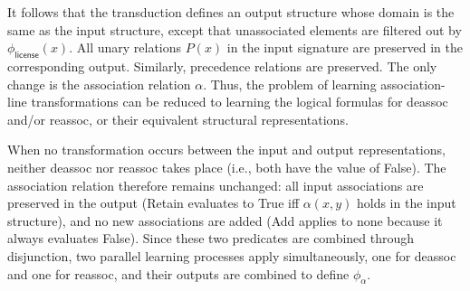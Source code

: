 \documentclass[pmlr]{jmlr}%
\begin{document}
	It follows that the transduction 
	defines an output structure whose domain is the same as the input 
	structure, except that unassociated elements are filtered out by
	$\phi_{\textsf{license}}(x)$. All 
	unary relations \(P(x)\) in the input signature are 
	preserved in the corresponding output. Similarly,
	precedence relations are preserved. The only 
	change is the association relation \(\alpha\).
	Thus, the problem of learning association-line 
	transformations can be reduced to learning the logical 
	formulas for \textsf{deassoc} and/or \textsf{reassoc}, or their equivalent structural representations. 
	
	When no transformation occurs between the input and 
	output representations, neither \textsf{deassoc} nor 
	\textsf{reassoc} takes place (i.e., both have the value of
	False). The association relation therefore remains unchanged: 
	all input associations are preserved in the output 
	(\textsf{Retain} evaluates to True iff \(\alpha(x,y)\) holds in the input structure), and no new associations are 
	added (\textsf{Add} applies to none because it always evaluates False).
	Since these two predicates are combined through disjunction, 
	two parallel learning processes apply simultaneously, one for \textsf{deassoc} and one for \textsf{reassoc}, 
	and their outputs are combined to define $\phi_\alpha$.
	
\end{document}

